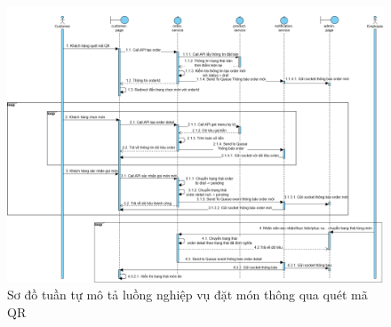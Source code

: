 \begin{figure}[h]
	\centering
	\includegraphics[width=1.1\textwidth]{images/hChip/main-flow/order.png}
	\caption{Sơ đồ tuần tự mô tả luồng nghiệp vụ đặt món thông qua quét mã QR}
	\label{fig:order-sequence-flow}
\end{figure}

